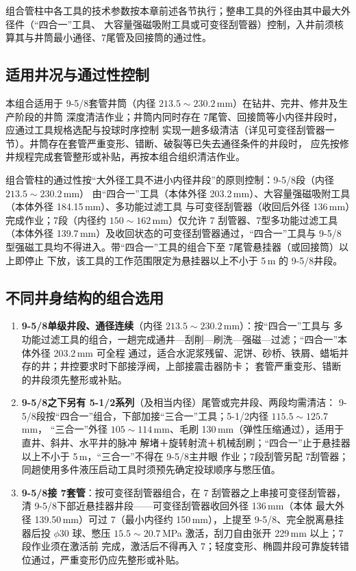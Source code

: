 组合管柱中各工具的技术参数按本章前述各节执行；整串工具的外径由其中最大外径件（“四合一”工具、
大容量强磁吸附工具或可变径刮管器）控制，入井前须核算其与井筒最小通径、7\inch 尾管及回接筒的通过性。

\subsection{适用井况与通过性控制}

本组合适用于 9-5/8\inch 套管井筒（内径 $213.5\sim230.2$\,mm）在钻井、完井、修井及生产阶段的井筒
深度清洁作业；井筒内同时存在 7\inch 尾管、回接筒等小内径井段时，应通过工具规格选配与投球时序控制
实现一趟多级清洁（详见可变径刮管器一节）。井筒存在套管严重变形、错断、破裂等已失去通径条件的井段时，
应先按修井规程完成套管整形或补贴，再按本组合组织清洁作业。

组合管柱的通过性按“大外径工具不进小内径井段”的原则控制：9-5/8\inch 段（内径 $213.5\sim230.2$\,mm）
由“四合一”工具（本体外径 203.2\,mm）、大容量强磁吸附工具（本体外径 184.15\,mm）、多功能过滤工具
与可变径刮管器（收回后外径 136\,mm）完成作业；7\inch 段（内径约 $150\sim162$\,mm）仅允许 7\inch
刮管器、7\inch 型多功能过滤工具（本体外径 139.7\,mm）及收回状态的可变径刮管器通过，“四合一”工具与
9-5/8\inch 型强磁工具均不得进入。带“四合一”工具的组合下至 7\inch 尾管悬挂器（或回接筒）以上即停止
下放，该工具的工作范围限定为悬挂器以上不小于 5\,m 的 9-5/8\inch 井段。

\subsection{不同井身结构的组合选用}

\begin{enumerate}[label=(\arabic*),leftmargin=2em,itemsep=2pt]
	\item \textbf{9-5/8\inch 单级井段、通径连续}（内径 $213.5\sim230.2$\,mm）：按“四合一”工具与
	多功能过滤工具的组合，一趟完成通井—刮削—刷洗—强磁—过滤；“四合一”本体外径 203.2\,mm 可全程
	通过，适合水泥浆残留、泥饼、砂桥、铁屑、蜡垢并存的井；井控要求时下部接浮阀，上部接震击器防卡；
	套管严重变形、错断的井段须先整形或补贴。
	\item \textbf{9-5/8\inch 之下另有 5-1/2\inch 系列}（及相当内径）尾管或完井段、两段均需清洁：
	9-5/8\inch 段按“四合一”组合，下部加接“三合一”工具；5-1/2\inch 内径 $115.5\sim125.7$\,mm，
	“三合一”外径 $105\sim114$\,mm、毛刷 130\,mm（弹性压缩通过），适用于直井、斜井、水平井的脉冲
	解堵＋旋转射流＋机械刮刷；“四合一”止于悬挂器以上不小于 5\,m，“三合一”不得在 9-5/8\inch 主井眼
	作业；7\inch 段刮管另配 7\inch 刮管器；同趟使用多件液压启动工具时须预先确定投球顺序与憋压值。
	\item \textbf{9-5/8\inch 接 7\inch 套管}：按可变径刮管器组合，在 7\inch 
	刮管器之上串接可变径刮管器，清 9-5/8\inch 下部近悬挂器井段——可变径刮管器收回外径 136\,mm（本体
	最大外径 139.50\,mm）可过 7\inch（最小内径约 150\,mm），上提至 9-5/8\inch、完全脱离悬挂器后投
	$\phi 30$ 球、憋压 $15.5\sim20.7$\,MPa 激活，刮刀自由张开 229\,mm 以上；7\inch 段作业须在激活前
	完成，激活后不得再入 7\inch；轻度变形、椭圆井段可靠旋转错位通过，严重变形仍应先整形或补贴。
\end{enumerate}


